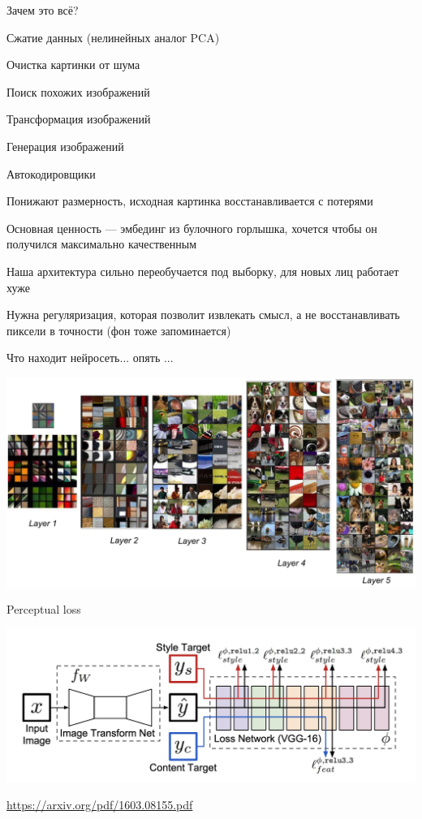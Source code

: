 \documentclass[notes,12pt, aspectratio=169]{beamer}
\newenvironment{wideitemize}{\itemize\addtolength{\itemsep}{10pt}}{\enditemize}
\begin{document}
\begin{frame}{Зачем это всё?}
\begin{wideitemize}
	\item  Сжатие данных (нелинейных аналог PCA)
	\item  Очистка картинки от шума
	\item  Поиск похожих изображений
	\item  Трансформация изображений
	\item  Генерация изображений
\end{wideitemize}
\end{frame}


\begin{frame}{Автокодировщики}
\begin{wideitemize}
	\item  Понижают размерность, исходная картинка восстанавливается с потерями
	\item  Основная ценность — эмбединг из булочного горлышка, хочется чтобы он получился максимально качественным
	\item  Наша архитектура сильно переобучается под выборку, для новых лиц работает хуже
	\item  Нужна регуляризация, которая позволит извлекать смысл, а не восстанавливать пиксели в точности (фон тоже запоминается)
\end{wideitemize}
\end{frame}


\begin{frame}{Что находит нейросеть... опять ...}
	\begin{center}
		\includegraphics[width=.85\linewidth]{cnn_vis.png}
	\end{center}
\end{frame}


\begin{frame}{Perceptual loss}
	\begin{center}
		\includegraphics[width=.8\linewidth]{perceptual_loss.png}
	\end{center}
	\vfill
	\footnotesize
	{\color{blue} \url{https://arxiv.org/pdf/1603.08155.pdf}} 
\end{frame}
\end{document}
